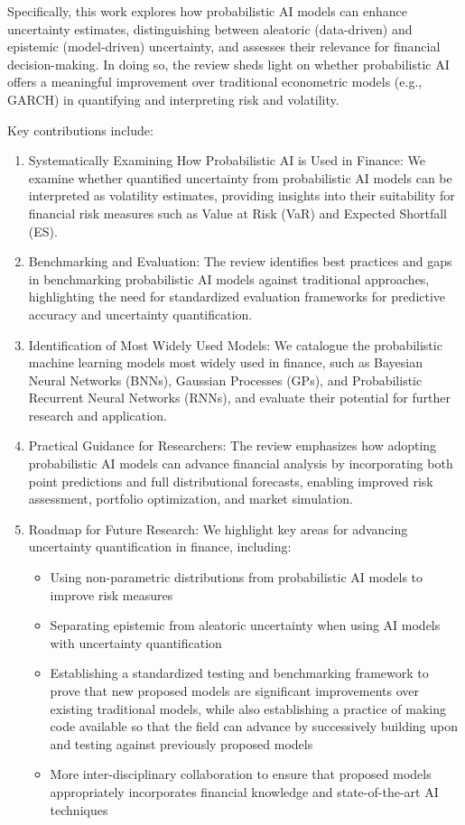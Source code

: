 Specifically, this work explores how probabilistic AI models can enhance uncertainty estimates, distinguishing between aleatoric (data-driven) and epistemic (model-driven) uncertainty, and assesses their relevance for financial decision-making. In doing so, the review sheds light on whether probabilistic AI offers a meaningful improvement over traditional econometric models (e.g., GARCH) in quantifying and interpreting risk and volatility.

Key contributions include:

\begin{enumerate}
    \item Systematically Examining How Probabilistic AI is Used in Finance: We examine whether quantified uncertainty from probabilistic AI models can be interpreted as volatility estimates, providing insights into their suitability for financial risk measures such as Value at Risk (VaR) and Expected Shortfall (ES).
    \item Benchmarking and Evaluation: The review identifies best practices and gaps in benchmarking probabilistic AI models against traditional approaches, highlighting the need for standardized evaluation frameworks for predictive accuracy and uncertainty quantification.
    \item Identification of Most Widely Used Models: We catalogue the probabilistic machine learning models most widely used in finance, such as Bayesian Neural Networks (BNNs), Gaussian Processes (GPs), and Probabilistic Recurrent Neural Networks (RNNs), and evaluate their potential for further research and application.
    \item Practical Guidance for Researchers: The review emphasizes how adopting probabilistic AI models can advance financial analysis by incorporating both point predictions and full distributional forecasts, enabling improved risk assessment, portfolio optimization, and market simulation.
    \item Roadmap for Future Research: We highlight key areas for advancing uncertainty
quantification in finance, including:
        \begin{itemize}
            \item Using non-parametric distributions from probabilistic AI models to improve risk measures
            \item Separating epistemic from aleatoric uncertainty when using AI models with uncertainty quantification
            \item Establishing a standardized testing and benchmarking framework to prove that new proposed models are significant improvements over existing traditional models, while also establishing a practice of making code available so that the field can advance by successively building upon and testing against previously proposed models
            \item More inter-disciplinary collaboration to ensure that proposed models appropriately incorporates financial knowledge and state-of-the-art AI techniques
        \end{itemize}
\end{enumerate}

